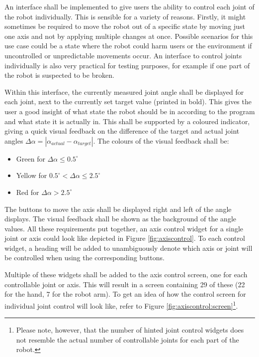 An interface shall be implemented to give users the ability to control each joint of the robot individually. This is sensible for a variety of reasons. Firstly, it might sometimes be required to move the robot out of a specific state by moving just one axis and not by applying multiple changes at once. Possible scenarios for this use case could be a state where the robot could harm users or the environment if uncontrolled or unpredictable movements occur. An interface to control joints individually is also very practical for testing purposes, for example if one part of the robot is suspected to be broken.

Within this interface, the currently measured joint angle shall be displayed for each joint, next to the currently set target value (printed in bold). This gives the user a good insight of what state the robot should be in according to the program and what state it is actually in. This shall be supported by a coloured indicator, giving a quick visual feedback on the difference of the target and actual joint angles $\Delta \alpha = |\alpha_{actual} - \alpha_{target}|$. The colours of the visual feedback shall be:

\begin{itemize}
	\item Green for $\Delta\alpha \leq 0.5^\circ$
	\item Yellow for $0.5^\circ < \Delta\alpha \leq 2.5^\circ$
	\item Red for $\Delta\alpha > 2.5^\circ$ 
\end{itemize}

The buttons to move the axis shall be displayed right and left of the angle displays. The visual feedback shall be shown as the background of the angle values. All these requirements put together, an axis control widget for a single joint or axis could look like depicted in Figure \ref{fig:axiscontrol}. To each control widget, a heading will be added to unambiguously denote which axis or joint will be controlled when using the corresponding buttons.

Multiple of these widgets shall be added to the axis control screen, one for each controllable joint or axis. This will result in a screen containing 29 of these (22 for the hand, 7 for the robot arm). To get an idea of how the control screen for individual joint control will look like, refer to Figure \ref{fig:axiscontrol:screen}\footnote{Please note, however, that the number of hinted joint control widgets does not resemble the actual number of controllable joints for each part of the robot.}. 

